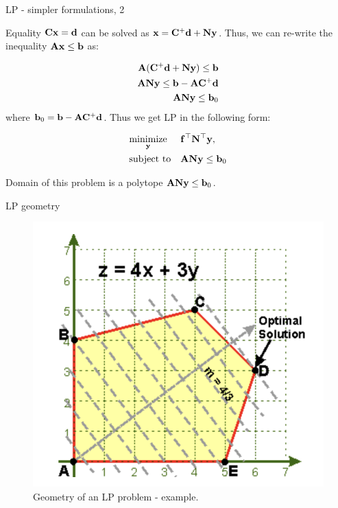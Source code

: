 \documentclass{beamer}
\begin{document}
\begin{frame}{LP - simpler formulations, 2}
	\begin{flushleft}
		
		Equality $\mathbf{C}\mathbf{x} = \mathbf{d}$ can be solved as $\mathbf{x} = \mathbf{C}^+\mathbf{d} + \mathbf{N}\mathbf{y}$. Thus, we can re-write the inequality $\mathbf{A}\mathbf{x} \leq \mathbf{b}$ as:
		
		\begin{align}
			\mathbf{A}(\mathbf{C}^+\mathbf{d} + \mathbf{N}\mathbf{y})  \leq \mathbf{b} 
			\\
			\mathbf{A}\mathbf{N}\mathbf{y}  \leq \mathbf{b} - \mathbf{A}\mathbf{C}^+\mathbf{d} 
			\\
			\mathbf{A}\mathbf{N}\mathbf{y}  \leq \mathbf{b}_0
		\end{align}
		where $\mathbf{b}_0 = \mathbf{b} - \mathbf{A}\mathbf{C}^+\mathbf{d} $. Thus we get LP in the following form:
		
		\begin{equation}
			\begin{aligned}
				& \underset{\mathbf{y}}{\text{minimize}}
				& & \mathbf{f}^\top \mathbf{N}^\top \mathbf{y} , \\
				& \text{subject to}
				& & \mathbf{A}\mathbf{N}\mathbf{y}  \leq \mathbf{b}_0
			\end{aligned}
		\end{equation}
		
		Domain of this problem is a polytope $\mathbf{A}\mathbf{N}\mathbf{y}  \leq \mathbf{b}_0$.
		
	\end{flushleft}
\end{frame}




\begin{frame}{LP geometry}
	\begin{flushleft}
		
		\begin{figure}
			\centering
			\includegraphics[width=0.70\linewidth]{LP_domain}
			\caption{Geometry of an LP problem - example.   }
			\label{fig:lpdomain}
		\end{figure}
		
		
	\end{flushleft}
\end{frame}
\end{document}
